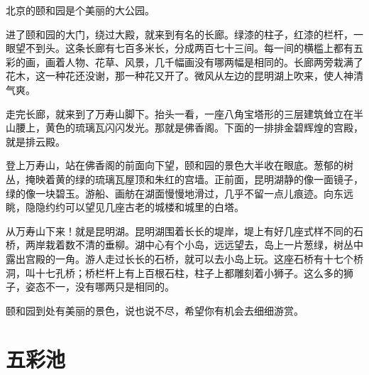 \documentclass[12pt,UTF-8,openany]{ctexbook}
\begin{document}
\begin{Large}
    
    北京的颐和园是个美丽的大公园。
    
    进了颐和园的大门，绕过大殿，就来到有名的长廊。绿漆的柱子，红漆的栏杆，一眼望不到头。这条长廊有七百多米长，分成两百七十三间。每一间的横槛上都有五彩的画，画着人物、花草、风景，几千幅画没有哪两幅是相同的。长廊两旁栽满了花木，这一种花还没谢，那一种花又开了。微风从左边的昆明湖上吹来，使人神清气爽。
    
    走完长廊，就来到了万寿山脚下。抬头一看，一座八角宝塔形的三层建筑耸立在半山腰上，黄色的琉璃瓦闪闪发光。那就是佛香阁。下面的一排排金碧辉煌的宫殿，就是排云殿。
    
    登上万寿山，站在佛香阁的前面向下望，颐和园的景色大半收在眼底。葱郁的树丛，掩映着黄的绿的琉璃瓦屋顶和朱红的宫墙。正前面，昆明湖静的像一面镜子，绿的像一块碧玉。游船、画舫在湖面慢慢地滑过，几乎不留一点儿痕迹。向东远眺，隐隐约约可以望见几座古老的城楼和城里的白塔。
    
    从万寿山下来！就是昆明湖。昆明湖围着长长的堤岸，堤上有好几座式样不同的石桥，两岸栽着数不清的垂柳。湖中心有个小岛，远远望去，岛上一片葱绿，树丛中露出宫殿的一角。游人走过长长的石桥，就可以去小岛上玩。这座石桥有十七个桥洞，叫十七孔桥；桥栏杆上有上百根石柱，柱子上都雕刻着小狮子。这么多的狮子，姿态不一，没有哪两只是相同的。
    
    颐和园到处有美丽的景色，说也说不尽，希望你有机会去细细游赏。
    
\end{Large}

\chapter{五彩池}
\end{document}
